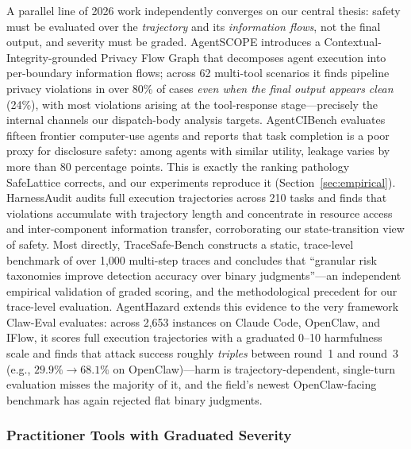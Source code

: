 \documentclass[manuscript,screen,review,anonymous]{acmart}
\begin{document}
A parallel line of 2026 work independently converges on our central thesis: safety must be evaluated over the \textit{trajectory} and its \textit{information flows}, not the final output, and severity must be graded. AgentSCOPE \cite{agentscope2026} introduces a Contextual-Integrity-grounded Privacy Flow Graph that decomposes agent execution into per-boundary information flows; across 62 multi-tool scenarios it finds pipeline privacy violations in over 80\% of cases \textit{even when the final output appears clean} (24\%), with most violations arising at the tool-response stage---precisely the internal channels our dispatch-body analysis targets. AgentCIBench \cite{agentcibench2026} evaluates fifteen frontier computer-use agents and reports that task completion is a poor proxy for disclosure safety: among agents with similar utility, leakage varies by more than 80 percentage points. This is exactly the ranking pathology SafeLattice corrects, and our experiments reproduce it (Section~\ref{sec:empirical}). HarnessAudit \cite{harnessaudit2026} audits full execution trajectories across 210 tasks and finds that violations accumulate with trajectory length and concentrate in resource access and inter-component information transfer, corroborating our state-transition view of safety. Most directly, TraceSafe-Bench \cite{tracesafe2026} constructs a static, trace-level benchmark of over 1,000 multi-step traces and concludes that ``granular risk taxonomies improve detection accuracy over binary judgments''---an independent empirical validation of graded scoring, and the methodological precedent for our trace-level evaluation. AgentHazard \cite{agenthazard2026} extends this evidence to the very framework Claw-Eval evaluates: across 2,653 instances on Claude Code, OpenClaw, and IFlow, it scores full execution trajectories with a graduated 0--10 harmfulness scale and finds that attack success roughly \emph{triples} between round~1 and round~3 (e.g., $29.9\% \to 68.1\%$ on OpenClaw)---harm is trajectory-dependent, single-turn evaluation misses the majority of it, and the field's newest OpenClaw-facing benchmark has again rejected flat binary judgments.

\subsubsection{Practitioner Tools with Graduated Severity}
\end{document}
